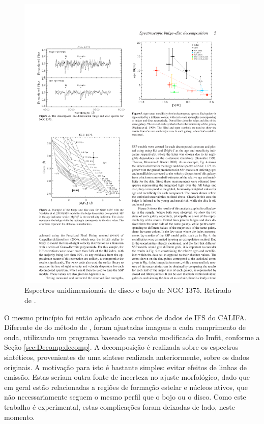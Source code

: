 \begin{figure}
	\includegraphics{figuras/johnston-spectra}
	\caption[Espectros das componentes morfológicas] {Espectros unidimensionais de
	disco e bojo de NGC 1375. Retirado de \citet{Johnston2012}.}
	\label{fig:spectraJohnston}
\end{figure}

O mesmo princípio foi então aplicado aos cubos de dados de IFS do CALIFA.
Diferente de do método de \citeauthor{Johnston2012}, foram ajustadas imagens a
cada comprimento de onda, utilizando um programa baseado na versão modificada do
Imfit, conforme a Seção \ref{sec:Decomp:decomp}. A decomposição é realizada
sobre os espectros sintéticos\fixme, provenientes de uma síntese realizada
anteriormente, sobre os dados originais. A motivação para isto é bastante
simples: evitar efeitos de linhas de emissão.
Estas seriam outra fonte de incerteza no ajuste morfológico, dado que em geral
estão relacionadas a regiões de formação estelar e núcleos ativos, que não
necessariamente seguem o mesmo perfil que o bojo ou o disco. Como este trabalho
é experimental, estas complicações foram deixadas de lado, neste momento.

